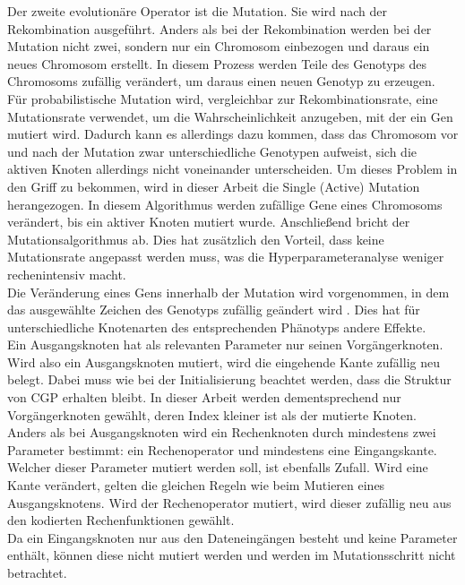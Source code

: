 Der zweite evolutionäre Operator ist die Mutation.
Sie wird nach der Rekombination ausgeführt.
Anders als bei der Rekombination werden bei der Mutation nicht zwei, sondern nur ein Chromosom einbezogen und daraus ein neues Chromosom erstellt.
In diesem Prozess werden Teile des Genotyps des Chromosoms zufällig verändert, um daraus einen neuen Genotyp zu erzeugen. \cite{milad_taleby_ahvanooey_survey_2019}\\
Für probabilistische Mutation wird, vergleichbar zur Rekombinationsrate, eine Mutationsrate verwendet, um die Wahrscheinlichkeit anzugeben, mit der ein Gen mutiert wird.
Dadurch kann es allerdings dazu kommen, dass das Chromosom vor und nach der Mutation zwar unterschiedliche Genotypen aufweist, sich die aktiven Knoten allerdings nicht voneinander unterscheiden.
Um dieses Problem in den Griff zu bekommen, wird in dieser Arbeit die Single (Active) Mutation herangezogen.
In diesem Algorithmus werden zufällige Gene eines Chromosoms verändert, bis ein aktiver Knoten mutiert wurde.
Anschließend bricht der Mutationsalgorithmus ab. \cite{miller_cartesian_2020}
Dies hat zusätzlich den Vorteil, dass keine Mutationsrate angepasst werden muss, was die Hyperparameteranalyse weniger rechenintensiv macht.\\

Die Veränderung eines Gens innerhalb der Mutation wird vorgenommen, in dem das ausgewählte Zeichen des Genotyps zufällig geändert wird \cite{koza_survey_1995}. Dies hat für unterschiedliche Knotenarten des entsprechenden Phänotyps andere Effekte.\\
Ein Ausgangsknoten hat als relevanten Parameter nur seinen Vorgängerknoten.
Wird also ein Ausgangsknoten mutiert, wird die eingehende Kante zufällig neu belegt.
Dabei muss wie bei der Initialisierung beachtet werden, dass die Struktur von CGP erhalten bleibt.
In dieser Arbeit werden dementsprechend nur Vorgängerknoten gewählt, deren Index kleiner ist als der mutierte Knoten.\\
Anders als bei Ausgangsknoten wird ein Rechenknoten durch mindestens zwei Parameter bestimmt: ein Rechenoperator und mindestens eine Eingangskante.
Welcher dieser Parameter mutiert werden soll, ist ebenfalls Zufall.
Wird eine Kante verändert, gelten die gleichen Regeln wie beim Mutieren eines Ausgangsknotens.
Wird der Rechenoperator mutiert, wird dieser zufällig neu aus den kodierten Rechenfunktionen gewählt.\\
Da ein Eingangsknoten nur aus den Dateneingängen besteht und keine Parameter enthält, können diese nicht mutiert werden und werden im Mutationsschritt nicht betrachtet.

